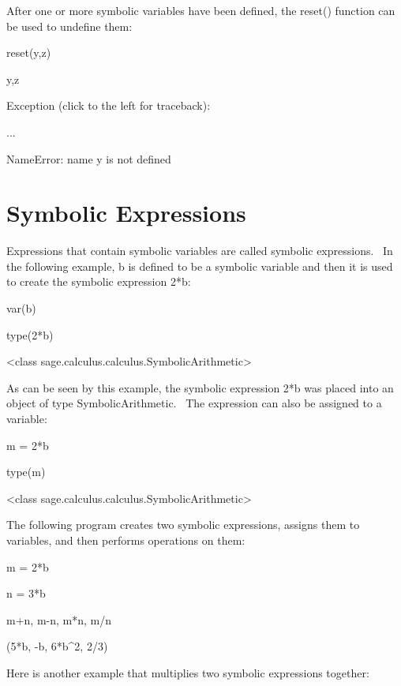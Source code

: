 \documentclass[12pt,twoside]{book}
\begin{document}
After one or more symbolic variables have been defined, the reset() function can be used to undefine them: 

\bigskip

reset({\textquotesingle}y,z{\textquotesingle})

y,z

{\textbar}

Exception (click to the left for traceback):

...

NameError: name {\textquotesingle}y{\textquotesingle} is not defined

\section[Symbolic Expressions]{Symbolic Expressions}

Expressions that contain symbolic variables are called symbolic expressions. \ In the following example, b is defined to be a symbolic variable and then it is used to create the symbolic expression 2*b: 

\bigskip

var({\textquotesingle}b{\textquotesingle})

type(2*b)

{\textbar}

{\textless}class {\textquotesingle}sage.calculus.calculus.SymbolicArithmetic{\textquotesingle}{\textgreater}

As can be seen by this example, the symbolic expression 2*b was placed into an object of type SymbolicArithmetic. \ The expression can also be assigned to a variable: 

\bigskip

m = 2*b

type(m)

{\textbar}

{\textless}class {\textquotesingle}sage.calculus.calculus.SymbolicArithmetic{\textquotesingle}{\textgreater}

The following program creates two symbolic expressions, assigns them to variables, and then performs operations on them: 

\bigskip

m = 2*b

n = 3*b

m+n, m{}-n, m*n, m/n

{\textbar}

(5*b, {}-b, 6*b\^{}2, 2/3)

Here is another example that multiplies two symbolic expressions together: 
\end{document}
